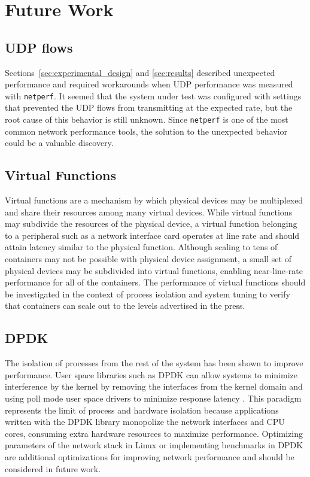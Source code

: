 \section{Future Work}
\label{sec:futurework}

\subsection{UDP flows} %
\label{sec:futureudpflows}
Sections~\ref{sec:experimental_design} and \ref{sec:results} described unexpected performance and required workarounds when UDP performance was measured with \texttt{netperf}. 
It seemed that the system under test was configured with settings that prevented the UDP flows from transmitting at the expected rate, but the root cause of this behavior is still unknown.  
Since \texttt{netperf} is one of the most common network performance tools, the solution to the unexpected behavior could be a valuable discovery.

\subsection{Virtual Functions} %
\label{sec:futurevirtualfunctions}
Virtual functions are a mechanism by which physical devices may be multiplexed and share their resources among many virtual devices.  
While virtual functions may subdivide the resources of the physical device, a virtual function belonging to a peripheral such as a network interface card operates at line rate and should attain latency similar to the physical function.  
Although scaling to tens of containers may not be possible with physical device assignment, a small set of physical devices may be subdivided into virtual functions, enabling near-line-rate performance for all of the containers.  
The performance of virtual functions should be investigated in the context of process isolation and system tuning to verify that containers can scale out to the levels advertised in the press.  

\subsection{DPDK} %
\label{sec:futuredpdk}
The isolation of processes from the rest of the system has been shown to improve performance.
User space libraries such as DPDK can allow systems to minimize interference by the kernel by removing the interfaces from the kernel domain and using poll mode user space drivers to minimize response latency \autocite{_dpdk_1}.  
This paradigm represents the limit of process and hardware isolation because applications written with the DPDK library monopolize the network interfaces and CPU cores, consuming extra hardware resources to maximize performance.
Optimizing parameters of the network stack in Linux or implementing benchmarks in DPDK are additional optimizations for improving network performance and should be considered in future work.


